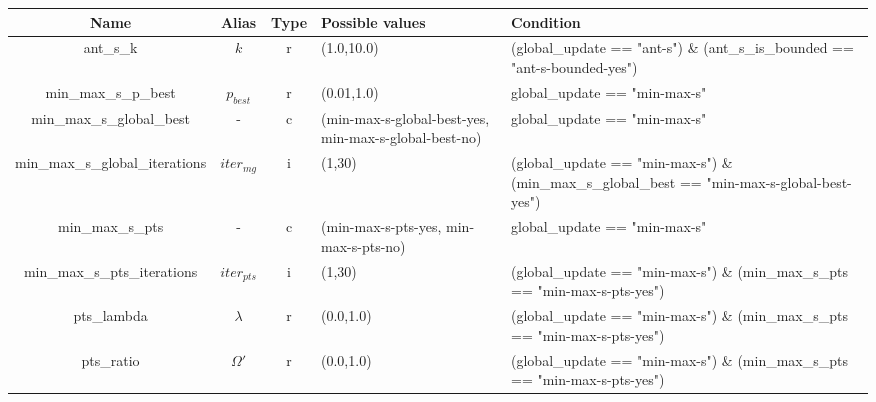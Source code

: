 \documentclass[11pt,a4paper,oneside]{book}
\begin{document}
\begin{table}[]
\centering
\begin{tabular}{|c|c|c|p{4cm}|p{4cm}|}
\hline
\textbf{Name}  & \textbf{Alias}      & \textbf{Type} & \textbf{Possible values}                                                                & \textbf{Condition}                                                                                     \\ \hline
ant\_s\_k                       & $k$        & r    & (1.0,10.0)                                                                     & (global\_update == "ant-s") \& (ant\_s\_is\_bounded == "ant-s-bounded-yes")                   \\ \hline
min\_max\_s\_p\_best            & $p_{best}$ & r    & (0.01,1.0)                                                                     & global\_update == "min-max-s"                                                                 \\ \hline
min\_max\_s\_global\_best       & -          & c    & (min-max-s-global-best-yes, min-max-s-global-best-no)                           & global\_update == "min-max-s"                                                                 \\ \hline
min\_max\_s\_global\_iterations & $iter_{mg}$ & i    & (1,30)                                                                         & (global\_update == "min-max-s") \& (min\_max\_s\_global\_best == "min-max-s-global-best-yes") \\ \hline
min\_max\_s\_pts                & -          & c    & (min-max-s-pts-yes, min-max-s-pts-no)                                           & global\_update == "min-max-s"                                                                 \\ \hline
min\_max\_s\_pts\_iterations    & $iter_{pts}$ & i    & (1,30)                                                                         & (global\_update == "min-max-s") \& (min\_max\_s\_pts == "min-max-s-pts-yes")                  \\ \hline
pts\_lambda                     & $\lambda$  & r    & (0.0,1.0)                                                                      & (global\_update == "min-max-s") \& (min\_max\_s\_pts == "min-max-s-pts-yes")                  \\ \hline
pts\_ratio                      & $\Omega'$  & r    & (0.0,1.0)                                                                      & (global\_update == "min-max-s") \& (min\_max\_s\_pts == "min-max-s-pts-yes")                  \\ \hline

\end{tabular}
\end{table}
\end{document}
